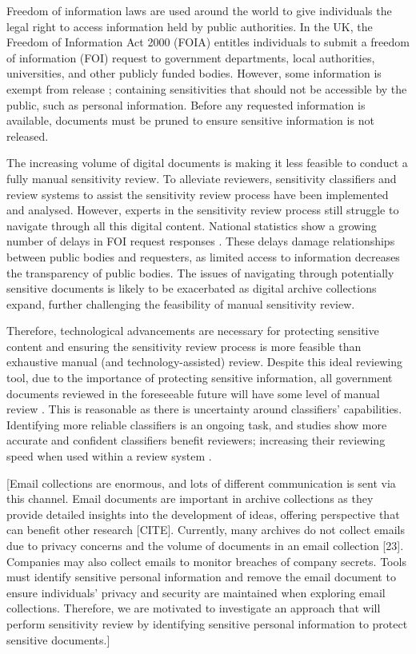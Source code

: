 Freedom of information laws are used around the world to give individuals the legal right to access information held by public authorities. In the UK, the Freedom of Information Act 2000 (FOIA) \cite{FOIA:00} entitles individuals to submit a freedom of information (FOI) request to government departments, local authorities, universities, and other publicly funded bodies. However, some information is exempt from release \cite{FOIA:00}; containing sensitivities that should not be accessible by the public, such as personal information. Before any requested information is available, documents must be pruned to ensure sensitive information is not released.

The increasing volume of digital documents is making it less feasible to conduct a fully manual sensitivity review. To alleviate reviewers, sensitivity classifiers \cite{mcdonald2014towards, mcdonald2017enhancing, baron2022providing} and review systems \cite{narvala2022sensitivity} to assist the sensitivity review process have been implemented and analysed. However, experts in the sensitivity review process still struggle to navigate through all this digital content. National statistics show a growing number of delays in FOI request responses \cite{SG:23, ONS:23}. These delays damage relationships between public bodies and requesters, as limited access to information decreases the transparency of public bodies. The issues of navigating through potentially sensitive documents is likely to be exacerbated as digital archive collections expand, further challenging the feasibility of manual sensitivity review.

Therefore, technological advancements are necessary for protecting sensitive content and ensuring the sensitivity review process is more feasible than exhaustive manual (and technology-assisted) review. Despite this ideal reviewing tool, due to the importance of protecting sensitive information, all government documents reviewed in the foreseeable future will have some level of manual review \cite{TNA:16}. This is reasonable as there is uncertainty around classifiers’ capabilities. Identifying more reliable classifiers is an ongoing task, and studies show more accurate and confident classifiers benefit reviewers; increasing their reviewing speed when used within a review system \cite{mcdonald2020accuracy}.

[Email collections are enormous, and lots of different communication is sent via this channel. Email documents are important in archive collections as they provide detailed insights into the development of ideas, offering perspective that can benefit other research [CITE]. Currently, many archives do not collect emails due to privacy concerns and the volume of documents in an email collection [23]. Companies may also collect emails to monitor breaches of company secrets. Tools must identify sensitive personal information and remove the email document to ensure individuals' privacy and security are maintained when exploring email collections. Therefore, we are motivated to investigate an approach that will perform sensitivity review by identifying sensitive personal information to protect sensitive documents.]


